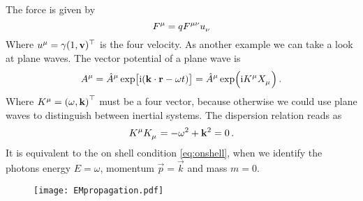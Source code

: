The  force is given by
\begin{equation}
    \tensor{F}{^\mu}=q\tensor{F}{^\mu^\nu}\tensor{u}{_\nu}
\end{equation}
Where $\tensor{u}{^\mu}=\gamma(1,\vec{v})\transpose$ is the four velocity. As
another example we can take a look at plane waves. The vector potential of a plane wave is
\begin{equation}
    \tensor{A}{^\mu}=\tensor{\hat{A}}{^\mu}
    \exp\left[\imI(\vec{k}\cdot\vec{r}-\omega
    t)\right]
    =\tensor{\hat{A}}{^\mu}\exp\left(\imI\tensor{K}{^\mu} \tensor{X}{_\mu}\right)\,
    .
\end{equation}
Where $\tensor{K}{^\mu}=\left(\omega,\vec{k}\right)\transpose$ must be a four
vector, because otherwise we could use plane waves to distinguish between
inertial systems. The dispersion relation reads as
\begin{equation}
    \tensor{K}{^\mu}\tensor{K}{_\mu}=-\omega^2+\vec{k}^2=0\, .
\end{equation}
It is equivalent to the on shell condition \eqref{eq:onshell}, when we identify
the photons energy $E=\omega$, momentum $\vec{p}=\vec{k}$ and mass $m=0$.
\begin{figure}[hbtp!]
\centering
 \texttt{[image: EMpropagation.pdf]}
\caption{}
\end{figure}

